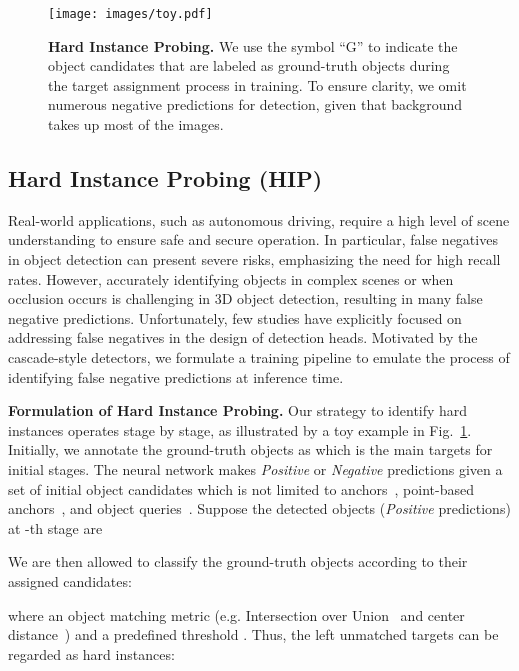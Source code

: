 \documentclass[10pt,twocolumn,letterpaper]{article}
\begin{document}
\begin{figure}[t]
	\begin{center}
		\texttt{[image: images/toy.pdf]}
	\end{center}
	\caption{\textbf{Hard Instance Probing.} We use the symbol ``G'' to indicate the object candidates that are labeled as ground-truth objects during the target assignment process in training. To ensure clarity, we omit numerous negative predictions for detection, given that background takes up most of the images.}
	\label{fig: toy example}
\end{figure}

\subsection{Hard Instance Probing (HIP)}
\label{sec:hip}
Real-world applications, such as autonomous driving, require a high level of scene understanding to ensure safe and secure operation. In particular, false negatives in object detection can present severe risks, emphasizing the need for high recall rates. However, accurately identifying objects in complex scenes or when occlusion occurs is challenging in 3D object detection, resulting in many false negative predictions. Unfortunately, few studies have explicitly focused on addressing false negatives in the design of detection heads. Motivated by the cascade-style detectors, we formulate a training pipeline to emulate the process of identifying false negative predictions at inference time.

\vspace{2mm}
\noindent\textbf{Formulation of Hard Instance Probing.}
Our strategy to identify hard instances operates stage by stage, as illustrated by a toy example in Fig.~\ref{fig: toy example}. Initially, we annotate the ground-truth objects as  which is the main targets for initial stages. The neural network makes \textit{Positive} or \textit{Negative} predictions given a set of initial object candidates 
which is not limited to anchors~\cite{fastrcnn}, point-based anchors~\cite{centerpoint}, and object queries~\cite{detr}. Suppose the detected objects (\textit{Positive} predictions) at -th stage  are 
 
We are then allowed to classify the ground-truth objects according to their assigned candidates:
 
where an object matching metric  (e.g. Intersection over Union~\cite{kitti, waymo} and center distance~\cite{nuscenes}) and a predefined threshold . Thus, the left unmatched targets can be regarded as hard instances:
 
\end{document}
